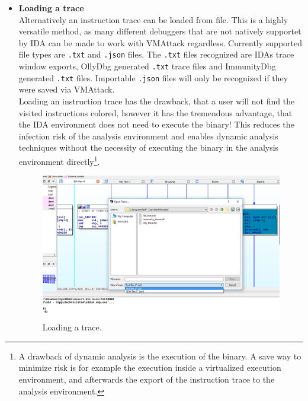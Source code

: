 \documentclass[10pt,twoside,a4paper,bibliography=totoc]{scrbook}
\newcommand{\code}[1]{\texttt{#1}}
\begin{document}
\begin{itemize}
\item{\textbf{Loading a trace}}\\
\newline
Alternatively an instruction trace can be loaded from file. This is a highly versatile method, as many different debuggers that are not natively supportet by IDA can be made to work with VMAttack regardless. Currently supported file types are \code{.txt} and \code{.json} files. The \code{.txt} files recognized are IDAs trace window exports, OllyDbg generated \code{.txt} trace files and ImmunityDbg generated \code{.txt} files. Importable \code{.json} files will only be recognized if they were saved via VMAttack. \\ Loading an instruction trace has the drawback, that a user will not find the visited instructions colored, however it has the tremendous advantage, that the IDA environment does not need to execute the binary! This reduces the infection risk of the analysis environment and enables dynamic analysis techniques without the necessity of executing the binary in the analysis environment directly\footnote{A drawback of dynamic analysis is the execution of the binary. A save way to minimize risk is for example the execution inside a virtualized execution environment, and afterwards the  export of the instruction trace to the analysis environment.}.
\begin{figure}[htp]
\centering
\includegraphics[scale=0.5]{images/ch3/load_trace.png}
\caption{Loading a trace.}
\label{gen_trace}
\end{figure}
\end{itemize}
\end{document}

